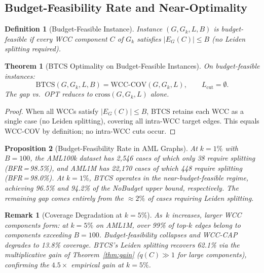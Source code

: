 \documentclass[11pt]{article}
\newtheorem{theorem}{Theorem}
\newtheorem{proposition}[theorem]{Proposition}
\newtheorem{definition}{Definition}
\newtheorem{remark}{Remark}
\begin{document}
\subsection{Budget-Feasibility Rate and Near-Optimality}

\begin{definition}[Budget-Feasible Instance]
Instance $(G,G_k,L,B)$ is \emph{budget-feasible} if every WCC component
$C$ of $G_k$ satisfies $|E_G(C)|\le B$ (no Leiden splitting required).
\end{definition}

\begin{theorem}[BTCS Optimality on Budget-Feasible Instances]\label{thm:bfi}
On budget-feasible instances:
\[
  \mathrm{BTCS}(G,G_k,L,B)=\mathrm{WCC\text{-}COV}(G,G_k,L),
  \qquad L_{\mathrm{cut}}=\emptyset.
\]
The gap vs.\ OPT reduces to $\mathrm{cross}(G,G_k,L)$ alone.
\end{theorem}

\begin{proof}
When all WCCs satisfy $|E_G(C)|\le B$, BTCS retains each WCC as a
single case (no Leiden splitting), covering all intra-WCC target edges.
This equals WCC-COV by definition; no intra-WCC cuts occur.
\end{proof}

\begin{proposition}[Budget-Feasibility Rate in AML Graphs]
At $k=1\%$ with $B=100$, the AML100k dataset has 2,546 cases of which
only 38 require splitting (BFR\,=\,98.5\%), and AML1M has 22,170 cases
of which 448 require splitting (BFR\,=\,98.0\%).
At $k=1\%$, BTCS operates in the near-budget-feasible regime,
achieving 96.5\% and 94.2\% of the NoBudget upper bound,
respectively. The remaining gap comes entirely from the $\approx2\%$
of cases requiring Leiden splitting.
\end{proposition}

\begin{remark}[Coverage Degradation at $k=5\%$]
As~$k$ increases, larger WCC components form: at $k=5\%$ on AML1M,
over 99\% of top-$k$ edges belong to components exceeding $B=100$.
Budget-feasibility collapses and WCC-CAP degrades to 13.8\% coverage.
BTCS's Leiden splitting recovers 62.1\% via the multiplicative gain of
Theorem~\ref{thm:gain} ($q(C)\gg1$ for large components),
confirming the $4.5\times$ empirical gain at $k=5\%$.
\end{remark}
\end{document}
